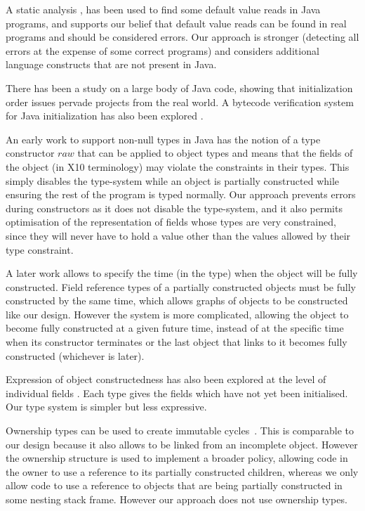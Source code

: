 A static analysis \cite{Seo:2007:SBD:1522565.1522587}, has been used to find
some default value reads in Java programs, and supports our belief that default
value reads can be found in real programs and should be considered errors.  Our
approach is stronger (detecting all errors at the expense of some correct
programs) and considers additional language constructs that are not present in
Java.

There has been a study on a large body \cite{Gil:2009:WRS:1615184.1615216} of
Java code, showing that initialization order issues pervade projects from the
real world.  A bytecode verification system for Java initialization has also
been explored \cite{Hubert:2010:ESO:1888881.1888890}.

An early work to support non-null types in Java
\cite{Fahndrich:2003:DCN:949305.949332} has the notion of a type constructor
$raw$ that can be applied to object types and means that the fields of the
object (in X10 terminology) may violate the constraints in their types.  This
simply disables the type-system while an object is partially constructed while
ensuring the rest of the program is typed normally.  Our approach prevents
errors during constructors as it does not disable the type-system, and it also
permits optimisation of the representation of fields whose types are very
constrained, since they will never have to hold a value other than the values
allowed by their type constraint.

A later work \cite{Fahndrich:2007:EOI:1297027.1297052,XinQi:2009} allows
    to specify the time
    (in the type) when the object will be fully constructed.
Field reference types of a partially constructed objects must be fully
constructed by the same time, which allows graphs of objects to be constructed
like our  design.  However the system is more complicated, allowing
the object to become fully constructed at a given future time, instead of at
the specific time when its constructor terminates or the last object that links
to it becomes fully constructed (whichever is later).

Expression of object constructedness has also been explored at the level of
individual fields \cite{XinQi:2009}.  Each type gives the fields which have not
yet been initialised.  Our type system is simpler but less expressive.

Ownership types can be used to create immutable cycles~\cite{Zibin:2010:OIG:1869459.1869509}.
This is comparable to
our  design because it also allows  to be linked from an
incomplete object.  However the ownership structure is used to implement a
broader policy, allowing code in the owner to use a reference to its partially
constructed children, whereas we only allow code to use a reference to objects
that are being partially constructed in some nesting stack frame.  However our
approach does not use ownership types.

